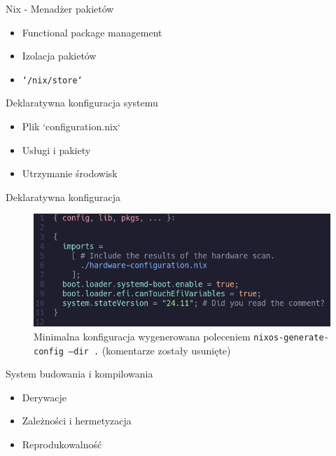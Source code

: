 \documentclass{beamer}
\begin{document}
\begin{frame}{Nix - Menadżer pakietów}
    \begin{itemize}
        \item Functional package management
        \item Izolacja pakietów
        \item \texttt{`/nix/store`}
    \end{itemize}
\end{frame}

\begin{frame}{Deklaratywna konfiguracja systemu}
    \begin{itemize}
        \item Plik `configuration.nix`
        \item Usługi i pakiety
        \item Utrzymanie środowisk
    \end{itemize}
\end{frame}

\begin{frame}{Deklaratywna konfiguracja}
    \begin{figure}
        \includegraphics[width=\linewidth]{./assets/configuration.png}
        \caption*{\scriptsize Minimalna konfiguracja wygenerowana poleceniem \texttt{nixos-generate-config --dir .} (komentarze zostały usunięte)}
    \end{figure}
\end{frame}

\begin{frame}{System budowania i kompilowania}
    \begin{itemize}
        \item Derywacje
        \item Zależności i hermetyzacja
        \item Reprodukowalność
    \end{itemize}
\end{frame}
\end{document}
